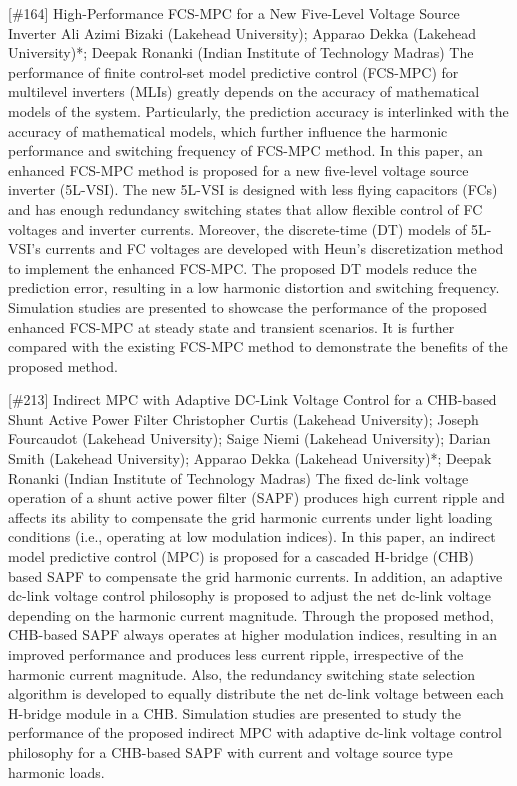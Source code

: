 {} \begin{abstract_online} {[\#164] High-Performance FCS-MPC for a New Five-Level Voltage Source Inverter} {} {Ali Azimi Bizaki (Lakehead University); Apparao Dekka (Lakehead University)*; Deepak Ronanki (Indian Institute of Technology Madras)} {} The performance of finite control-set model predictive control (FCS-MPC) for multilevel inverters (MLIs) greatly depends on the accuracy of mathematical models of the system. Particularly, the prediction accuracy is interlinked with the accuracy of mathematical models, which further influence the harmonic performance and switching frequency of FCS-MPC method. In this paper, an enhanced FCS-MPC method is proposed for a new five-level voltage source inverter (5L-VSI). The new 5L-VSI is designed with less flying capacitors (FCs) and has enough redundancy switching states that allow flexible control of FC voltages and inverter currents. Moreover, the discrete-time (DT) models of 5L-VSI's currents and FC voltages are developed with Heun's discretization method to implement the enhanced FCS-MPC. The proposed DT models reduce the prediction error, resulting in a low harmonic distortion and switching frequency. Simulation studies are presented to showcase the performance of the proposed enhanced FCS-MPC at steady state and transient scenarios. It is further compared with the existing FCS-MPC method to demonstrate the benefits of the proposed method. \end{abstract_online} 
{} \begin{abstract_online} {[\#213] Indirect MPC with Adaptive DC-Link Voltage Control for a CHB-based Shunt Active Power Filter} {} {Christopher Curtis (Lakehead University); Joseph Fourcaudot (Lakehead University); Saige Niemi (Lakehead University); Darian Smith (Lakehead University); Apparao Dekka (Lakehead University)*; Deepak Ronanki (Indian Institute of Technology Madras)} {} The fixed dc-link voltage operation of a shunt active power filter (SAPF) produces high current ripple and affects its ability to compensate the grid harmonic currents under light loading conditions (i.e., operating at low modulation indices). In this paper, an indirect model predictive control (MPC) is proposed for a cascaded H-bridge (CHB) based SAPF to compensate the grid harmonic currents. In addition, an adaptive dc-link voltage control philosophy is proposed to adjust the net dc-link voltage depending on the harmonic current magnitude. Through the proposed method, CHB-based SAPF always operates at higher modulation indices, resulting in an improved performance and produces less current ripple, irrespective of the harmonic current magnitude. Also, the redundancy switching state selection algorithm is developed to equally distribute the net dc-link voltage between each H-bridge module in a CHB. Simulation studies are presented to study the performance of the proposed indirect MPC with adaptive dc-link voltage control philosophy for a CHB-based SAPF with current and voltage source type harmonic loads. \end{abstract_online} 
